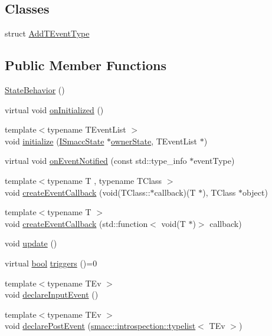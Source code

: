 \subsection*{Classes}
\begin{DoxyCompactItemize}
\item 
struct \hyperlink{structsmacc_1_1StateBehavior_1_1AddTEventType}{Add\+T\+Event\+Type}
\end{DoxyCompactItemize}
\subsection*{Public Member Functions}
\begin{DoxyCompactItemize}
\item 
\hyperlink{classsmacc_1_1StateBehavior_af12ce0aee0639e34b872fea3ac23c1d4}{State\+Behavior} ()
\item 
virtual void \hyperlink{classsmacc_1_1StateBehavior_af8b18ef9895f4753d0363c9efe21b6cf}{on\+Initialized} ()
\item 
{\footnotesize template$<$typename T\+Event\+List $>$ }\\void \hyperlink{classsmacc_1_1StateBehavior_aae97c74f5f11a96afccd78aa2c1566e7}{initialize} (\hyperlink{classsmacc_1_1ISmaccState}{I\+Smacc\+State} $\ast$\hyperlink{classsmacc_1_1StateBehavior_abdc8c883baf520fd01f98e046d045dca}{owner\+State}, T\+Event\+List $\ast$)
\item 
virtual void \hyperlink{classsmacc_1_1StateBehavior_ad04ebf39e7955d684642234d3e8252ea}{on\+Event\+Notified} (const std\+::type\+\_\+info $\ast$event\+Type)
\item 
{\footnotesize template$<$typename T , typename T\+Class $>$ }\\void \hyperlink{classsmacc_1_1StateBehavior_a74dcb4a32f0d6aecf8bf35872e8be6bb}{create\+Event\+Callback} (void(T\+Class\+::$\ast$callback)(T $\ast$), T\+Class $\ast$object)
\item 
{\footnotesize template$<$typename T $>$ }\\void \hyperlink{classsmacc_1_1StateBehavior_aeb745a538bfe3745d5de8225cd6760ff}{create\+Event\+Callback} (std\+::function$<$ void(T $\ast$)$>$ callback)
\item 
void \hyperlink{classsmacc_1_1StateBehavior_a5aa08609fe8095513e762ae40ca4884b}{update} ()
\item 
virtual \hyperlink{classbool}{bool} \hyperlink{classsmacc_1_1StateBehavior_a29fc4e24391c977f8686424326b3b70f}{triggers} ()=0
\item 
{\footnotesize template$<$typename T\+Ev $>$ }\\void \hyperlink{classsmacc_1_1StateBehavior_a70f1d1efdafa981fe60b06308a528218}{declare\+Input\+Event} ()
\item 
{\footnotesize template$<$typename T\+Ev $>$ }\\void \hyperlink{classsmacc_1_1StateBehavior_ad7f9270d45491624f3bd19ff04dbad69}{declare\+Post\+Event} (\hyperlink{structsmacc_1_1introspection_1_1typelist}{smacc\+::introspection\+::typelist}$<$ T\+Ev $>$)
\end{DoxyCompactItemize}
